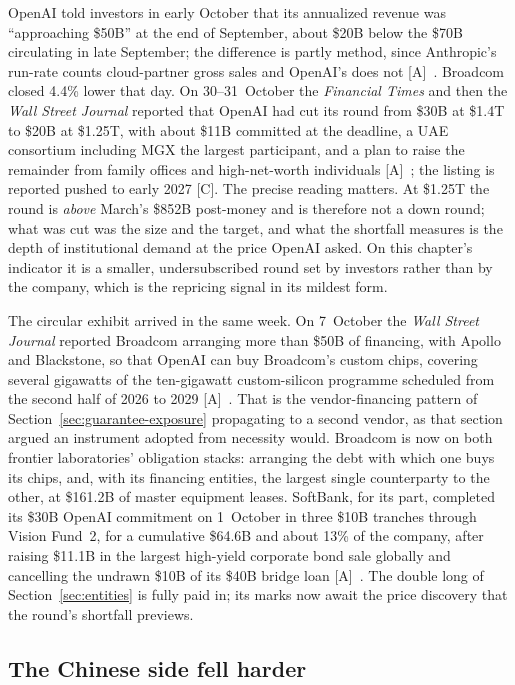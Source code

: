 OpenAI told investors in early October that its annualized revenue was ``approaching \$50B'' at the end of September, about \$20B below the \$70B circulating in late September; the difference is partly method, since Anthropic's run-rate counts cloud-partner gross sales and OpenAI's does not [A]~\cite{cap-openai-revenue-ft}. Broadcom closed 4.4\% lower that day. On 30--31~October the \emph{Financial Times} and then the \emph{Wall Street Journal} reported that OpenAI had cut its round from \$30B at \$1.4T to \$20B at \$1.25T, with about \$11B committed at the deadline, a UAE consortium including MGX the largest participant, and a plan to raise the remainder from family offices and high-net-worth individuals [A]~\cite{cap-openai-round}; the listing is reported pushed to early 2027 [C]. The precise reading matters. At \$1.25T the round is \emph{above} March's \$852B post-money and is therefore not a down round; what was cut was the size and the target, and what the shortfall measures is the depth of institutional demand at the price OpenAI asked. On this chapter's indicator it is a smaller, undersubscribed round set by investors rather than by the company, which is the repricing signal in its mildest form.

The circular exhibit arrived in the same week. On 7~October the \emph{Wall Street Journal} reported Broadcom arranging more than \$50B of financing, with Apollo and Blackstone, so that OpenAI can buy Broadcom's custom chips, covering several gigawatts of the ten-gigawatt custom-silicon programme scheduled from the second half of 2026 to 2029 [A]~\cite{cap-broadcom-openai-debt}. That is the vendor-financing pattern of Section~\ref{sec:guarantee-exposure} propagating to a second vendor, as that section argued an instrument adopted from necessity would. Broadcom is now on both frontier laboratories' obligation stacks: arranging the debt with which one buys its chips, and, with its financing entities, the largest single counterparty to the other, at \$161.2B of master equipment leases. SoftBank, for its part, completed its \$30B OpenAI commitment on 1~October in three \$10B tranches through Vision Fund~2, for a cumulative \$64.6B and about 13\% of the company, after raising \$11.1B in the largest high-yield corporate bond sale globally and cancelling the undrawn \$10B of its \$40B bridge loan [A]~\cite{cap-softbank-complete}. The double long of Section~\ref{sec:entities} is fully paid in; its marks now await the price discovery that the round's shortfall previews.

\subsection{The Chinese side fell harder}
\label{sec:cap-oct-china}


